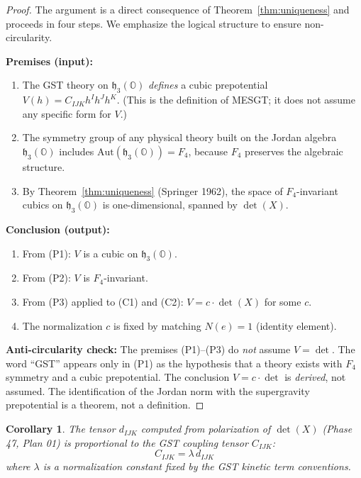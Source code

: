 \documentclass[11pt]{article}
\newtheorem{corollary}[theorem]{Corollary}
\begin{document}
\begin{proof}
The argument is a direct consequence of Theorem~\ref{thm:uniqueness} and proceeds
in four steps. We emphasize the logical structure to ensure non-circularity.

\textbf{Premises (input):}
\begin{enumerate}
\item[(P1)] The GST theory on $\mathfrak{h}_3(\mathbb{O})$ \emph{defines} a cubic
prepotential $V(h) = C_{IJK} h^I h^J h^K$. (This is the definition of MESGT;
it does not assume any specific form for $V$.)
\item[(P2)] The symmetry group of any physical theory built on the Jordan algebra
$\mathfrak{h}_3(\mathbb{O})$ includes $\mathrm{Aut}(\mathfrak{h}_3(\mathbb{O})) = F_4$,
because $F_4$ preserves the algebraic structure.
\item[(P3)] By Theorem~\ref{thm:uniqueness} (Springer 1962), the space of $F_4$-invariant
cubics on $\mathfrak{h}_3(\mathbb{O})$ is one-dimensional, spanned by $\det(X)$.
\end{enumerate}

\textbf{Conclusion (output):}
\begin{enumerate}
\item[(C1)] From (P1): $V$ is a cubic on $\mathfrak{h}_3(\mathbb{O})$.
\item[(C2)] From (P2): $V$ is $F_4$-invariant.
\item[(C3)] From (P3) applied to (C1) and (C2): $V = c \cdot \det(X)$ for some $c$.
\item[(C4)] The normalization $c$ is fixed by matching $N(e) = 1$ (identity element).
\end{enumerate}

\textbf{Anti-circularity check:} The premises (P1)--(P3) do \emph{not} assume
$V = \det$. The word ``GST'' appears only in (P1) as the hypothesis that a theory
exists with $F_4$ symmetry and a cubic prepotential. The conclusion $V = c \cdot \det$
is \emph{derived}, not assumed. The identification of the Jordan norm with the
supergravity prepotential is a theorem, not a definition.
\end{proof}

\begin{corollary}
The tensor $d_{IJK}$ computed from polarization of $\det(X)$ (Phase 47, Plan 01)
is proportional to the GST coupling tensor $C_{IJK}$:
\[
C_{IJK} = \lambda \, d_{IJK}
\]
where $\lambda$ is a normalization constant fixed by the GST kinetic term conventions.
\end{corollary}
\end{document}
